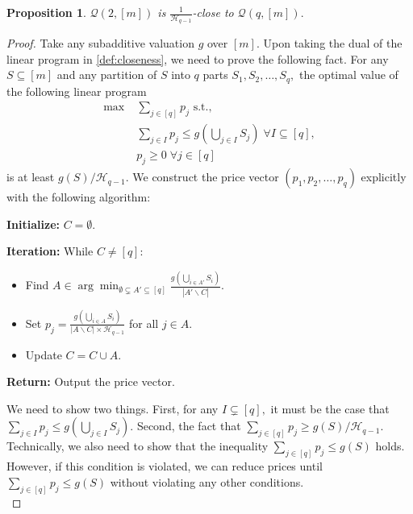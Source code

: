 \documentclass[11pt]{article}\usepackage{amsfonts}
\newtheorem{proposition}[theorem]{Proposition}
\numberwithin{theorem}{subsection}
\newcommand{\classqm}{\mathcal{Q}(q,[m])}
\begin{document}
\noindent
\begin{proposition}
\label{lem:qparttosa}
 $\mathcal{Q}(2,[m])$ is $\frac{1}{\mathcal{H}_{q-1}}$-close to $\classqm.$
\end{proposition}
\begin{proof} Take any subadditive valuation $g$ over $[m].$ Upon taking the dual of the linear program in \cref{def:closeness}, we need to prove the following fact. For any $S\subseteq [m]$ and any partition of $S$ into $q$ parts $S_1, S_2, \ldots, S_q,$ the optimal value of the following linear program 
\begin{equation*}
    \begin{split}
        \max \; &\sum_{j \in [q]} p_j \text{ s.t.,}\\
        &\sum_{j \in I}p_j\le g(\bigcup_{j \in I}S_j)\; \forall  I\subseteq [q],\\
        &p_j\ge 0 \; \forall j \in [q]
    \end{split}
\end{equation*}
is at least $g(S)/\mathcal{H}_{q-1}.$ We construct the price vector $(p_1, p_2, \ldots, p_q)$ explicitly with the following algorithm:
\begin{tcolorbox}[colback=black!5!white,colframe=black!75!black, title = {Algorithm for Constructing Price Vectors}]
\textbf{Initialize:} $C = \emptyset.$

\noindent
\textbf{Iteration:} While $C\neq [q]:$
\begin{itemize}
    \item Find $\displaystyle A \in  \arg \min_{\emptyset \subsetneq A'\subseteq [q]}\frac{g(\bigcup_{i\in A'}S_i)}{|A'\backslash C|}.$
    \item Set $p_j = \frac{g(\bigcup_{i\in A}S_i)}{|A\backslash C|\times \mathcal{H}_{q-1}}$ for all $j \in A.$
    \item Update $C = C\cup A.$
\end{itemize}

\noindent
\textbf{Return:} Output the price vector.  
\end{tcolorbox}

\noindent
We need to show two things. First, for any $I\subsetneq [q],$ it must be the case that $\sum_{j \in I}p_j\le g(\bigcup_{j \in I}S_j).$ Second, the fact that $\sum_{j \in [q]}p_j\ge g(S)/\mathcal{H}_{q-1}.$ Technically, we also need to show that the inequality $\sum_{j \in [q]}p_j\le g(S)$ holds. However, if this condition is violated, we can reduce prices until $\sum_{j \in [q]}p_j\le g(S)$ without violating any other conditions.\\


\end{proof}
\end{document}
